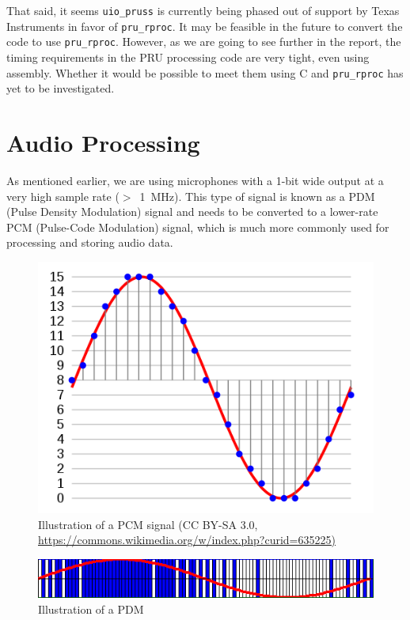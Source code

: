 \documentclass[]{report}
\begin{document}
That said, it seems \texttt{uio\_pruss} is currently being phased out of support by Texas Instruments in favor of \texttt{pru\_rproc}. It may be feasible in the future to convert the code to use \texttt{pru\_rproc}. However, as we are going to see further in the report, the timing requirements in the PRU processing code are very tight, even using assembly. Whether it would be possible to meet them using C and \texttt{pru\_rproc} has yet to be investigated.

\hypertarget{audio-processing}{%
\section{Audio Processing}\label{audio-processing}}

As mentioned earlier, we are using microphones with a 1-bit wide output at a very high sample rate ($ > $~1~MHz). This type of signal is known as a PDM (Pulse Density Modulation) signal and needs to be converted to a lower-rate PCM (Pulse-Code Modulation) signal, which is much more commonly used for processing and storing audio data.

\begin{figure}[h]
\centering
\includegraphics[width=0.7\linewidth]{Pictures/PCM.png}
\caption{Illustration of a PCM signal (CC BY-SA 3.0, \url{https://commons.wikimedia.org/w/index.php?curid=635225)}}
\end{figure}

\begin{figure}[h]
\centering
\includegraphics[width=1.0\linewidth]{Pictures/PDM.png}
\caption{Illustration of a PDM}
\end{figure}
\end{document}
